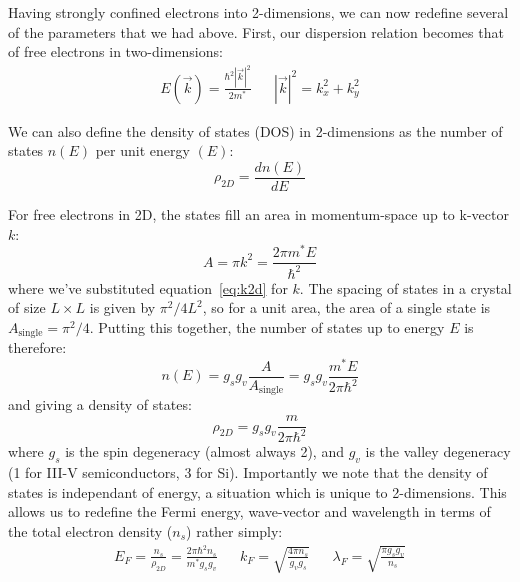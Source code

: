 Having strongly confined electrons into 2-dimensions, we can now redefine several of the parameters that we had above. First, our
dispersion relation becomes that of free electrons in two-dimensions:
\begin{align}
  E(\vec{k}) = \frac{\hbar^2 |\vec{k}|^2}{2m^*} && |\vec{k}|^2 = k_x^2 + k_y^2
  \label{eq:k2d}
\end{align}

We can also define the density of states (DOS) in 2-dimensions as the number of states $n(E)$ per unit energy $(E)$:
\begin{equation}
  \rho_{2D} = \frac{d n(E)}{d E}
\end{equation}

For free electrons in 2D, the states fill an area in momentum-space up to k-vector $k$:
\begin{equation}
  A = \pi k^2 = \frac{2 \pi m^* E}{\hbar^2}
\end{equation}
where we've substituted equation~\ref{eq:k2d} for $k$. The spacing of states in a crystal of size $L \times L$ is given
by $\pi^2/4 L^2$, so for a unit area, the area of a single state is $A_{\textrm{single}} = \pi^2/4$. Putting this together,
the number of states up to energy $E$ is therefore:
\begin{equation}
  n(E) = g_s g_v \frac{A}{A_{\textrm{single}}} = g_s g_v \frac{m^* E}{2 \pi \hbar^2}
\end{equation}
and giving a density of states:
\begin{equation}
  \rho_{2D} = g_s g_v \frac{m}{2 \pi \hbar^2}
\end{equation}
where $g_s$ is the spin degeneracy (almost always 2), and $g_v$ is the valley degeneracy (1 for III-V semiconductors, 3 for Si).
Importantly we note that the density of states is independant of energy, a situation which is unique to 2-dimensions. This allows
us to redefine the Fermi energy, wave-vector and wavelength in terms of the total electron density ($n_s$) rather simply:
\begin{align}
  E_F = \frac{n_s}{\rho_{2D}} = \frac{2 \pi \hbar^2 n_s}{m^* g_s g_v} &&
  k_F = \sqrt{\frac{4 \pi n_s}{g_v g_s}} &&
  \lambda_F = \sqrt{\frac{\pi g_s g_v}{n_s}}
\end{align}

